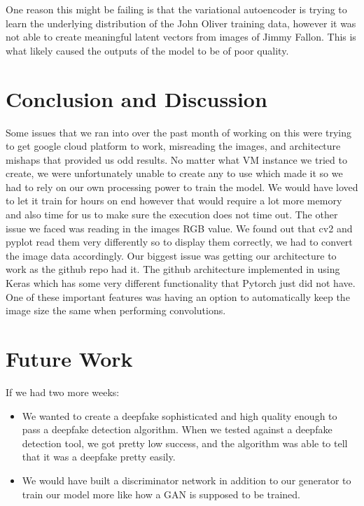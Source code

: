 \documentclass{article}
\begin{document}
One reason this might be failing is that the variational autoencoder is trying to learn the underlying distribution of the John Oliver training data, however it was not able to create meaningful latent vectors from images of Jimmy Fallon. This is what likely caused the outputs of the model to be of poor quality. 

\section{Conclusion and Discussion}
Some issues that we ran into over the past month of working on this were trying to get google cloud platform to work, misreading the images, and architecture mishaps that provided us odd results. 
No matter what VM instance we tried to create, we were unfortunately unable to create any to use which made it so we had to rely on our own processing power to train the model. We would have loved to let it train for hours on end however that would require a lot more memory and also time for us to make sure the execution does not time out. 
The other issue we faced was reading in the images RGB value. We found out that cv2 and pyplot read them very differently so to display them correctly, we had to convert the image data accordingly. 
Our biggest issue was getting our architecture to work as the github repo had it. The github architecture implemented in using Keras which has some very different functionality that Pytorch just did not have. One of these important features was having an option to automatically keep the image size the same when performing convolutions. 


\section{Future Work}

If we had two more weeks:
\begin{itemize}
  \item We wanted to create a deepfake sophisticated and high quality enough to pass a deepfake detection algorithm. When we tested against a deepfake detection tool, we got pretty low success, and the algorithm was able to tell that it was a deepfake pretty easily.

  \item We would have built a discriminator network in addition to our generator to train our model more like how a GAN is supposed to be trained. 
\end{itemize}
\end{document}
